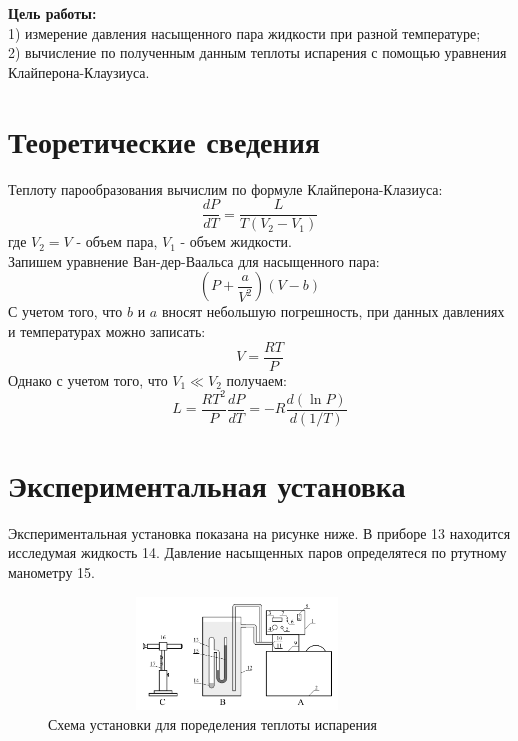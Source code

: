 \textbf{Цель работы:}\\
1) измерение давления насыщенного пара жидкости при разной температуре;\\
2) вычисление по полученным данным теплоты испарения с помощью уравнения 
Клайперона-Клаузиуса. \\\indent 

\section*{Теоретические сведения}
Теплоту парообразования вычислим по формуле Клайперона-Клазиуса:
\begin{equation}
    \frac{dP}{dT} = \frac{L}{T(V_2 - V_1)}
\end{equation}
где $V_2 = V$ - объем пара, $V_1$ - объем жидкости.\\\indent
Запишем уравнение Ван-дер-Ваальса для насыщенного пара:
\begin{equation}
    \left ( P + \frac{a}{V^2}\right )(V - b)
\end{equation}
С учетом того, что $b$ и $a$ вносят небольшую погрешность, 
при данных давлениях и температурах можно записать:
\begin{equation}
    V = \frac{RT}{P}
\end{equation}
Однако с учетом того, что $V_1 \ll V_2$ получаем:
\begin{equation}
    L = \frac{RT^2}{P}\frac{dP}{dT} = -R\frac{d(\ln P)}{d(1/T)}
\end{equation}

\section*{Экспериментальная установка}
Экспериментальная установка показана на рисунке ниже. В приборе 13 находится 
исследумая жидкость 14. Давление насыщенных паров определятеся по 
ртутному манометру 15. 
\newpage
\begin{figure}[t!]
    \centering
    \includegraphics[width=10cm,height=3cm]{setup.png}
    \caption{Схема установки для поределения теплоты испарения}
    \label{fig:setup}
\end{figure}


